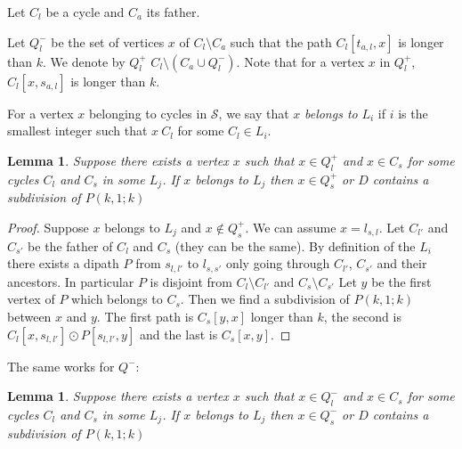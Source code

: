 \documentclass[utf8,10pt]{article}
\theoremstyle{plain}
\newtheorem{lemma}[theorem]{Lemma}
\theoremstyle{definition}
\theoremstyle{remark}
\begin{document}
Let $C_l$ be a cycle and $C_a$ its father. 

Let $Q^-_l$ be the set of vertices $x$ of $C_l \setminus C_a$ such that the path $C_l[t_{a,l}, x]$ is longer than $k$. 
We denote by $Q^+_l$ $C_l \setminus( C_a \cup Q^-_l) $. Note that for a vertex $x$ in  $Q^+_l$, $C_l[x,s_{a,l}]$ is longer than $k$. 

For a vertex $x$ belonging to cycles in $\mathcal{S}$, we say that $x$ \textit{belongs to}  $L_i$ if
$i$ is the smallest integer such that $x \ C_l$ for some $C_l \in L_i$.

\begin{lemma}\label{lem:Qpos}
Suppose there exists a vertex $x$ such that $x \in Q^+_l$ and $x \in C_s$ for some cycles $C_l$ and $C_s$ in some $L_j$.
If $x$ belongs to $L_j$ then  $x \in  Q^+_s$ or $D$ contains a subdivision of $P(k,1;k)$
\end{lemma}

\begin{proof}
Suppose $x$ belongs to $L_j$ and $x \not \in  Q^+_s$. We can assume $x = l_{s,l}$.
Let $C_{l'}$ and $C_{s'}$ be the father of $C_l$ and $C_s$ (they can be the same). 
By definition of the $L_i$ there exists a dipath $P$ from $s_{l,l'}$ to $l_{s,s'}$ only going through $C_{l'}$, $C_{s'}$ and their ancestors.
In particular $P$ is disjoint from $C_l \setminus C_{l'}$ and  $C_s \setminus C_{s'}$
Let $y$ be the first vertex of $P$ which belongs to $C_s$. Then we find a subdivision of $P(k,1;k)$ between $x$ and $y$.
The first path is $C_s[y,x]$ longer than $k$, the second is $C_l[x,s_{l,l'}] \odot P[ s_{l,l'}, y]$ and the last is $C_s[x,y]$.
\end{proof}

The same works for $Q^-$:

\begin{lemma}\label{lem:Qneg}
Suppose there exists a vertex $x$ such that $x \in Q^-_l$ and $x \in C_s$ for some cycles $C_l$ and $C_s$ in some $L_j$.
If $x$ belongs to $L_j$ then  $x \in  Q^-_s$ or $D$ contains a subdivision of $P(k,1;k)$
\end{lemma}


\end{document}
